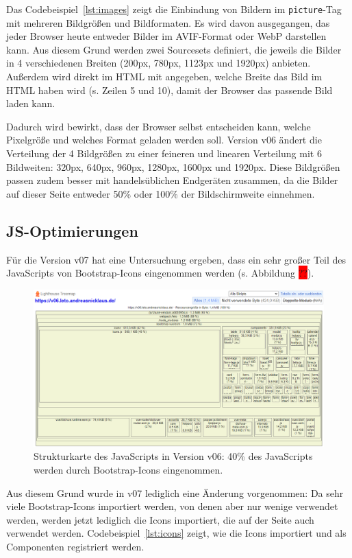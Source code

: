 \documentclass[11pt,a4paper]{article}
\begin{document}
Das Codebeispiel~\ref{lst:images} zeigt die Einbindung von Bildern im \verb|picture|-Tag mit mehreren Bildgrößen und Bildformaten.
Es wird davon ausgegangen, das jeder Browser heute entweder Bilder im AVIF-Format oder WebP darstellen kann.
Aus diesem Grund werden zwei Sourcesets definiert, die jeweils die Bilder in 4 verschiedenen Breiten (200px, 780px, 1123px und 1920px) anbieten.
Außerdem wird direkt im HTML mit angegeben, welche Breite das Bild im HTML haben wird (s. Zeilen 5 und 10), damit der Browser das passende Bild laden kann.

Dadurch wird bewirkt, dass der Browser selbst entscheiden kann, welche Pixelgröße und welches Format geladen werden soll.
Version v06 ändert die Verteilung der 4 Bildgrößen zu einer feineren und linearen Verteilung mit 6 Bildweiten: 320px, 640px, 960px, 1280px, 1600px und 1920px.
Diese Bildgrößen passen zudem besser mit handelsüblichen Endgeräten zusammen, da die Bilder auf dieser Seite entweder 50\% oder 100\% der Bildschirmweite einnehmen.   

\subsection{JS-Optimierungen}
Für die Version v07 hat eine Untersuchung ergeben, dass ein sehr großer Teil des JavaScripts von Bootstrap-Icons eingenommen werden (s. Abbildung \colorbox{red}{??}).

\begin{figure}[h]
  \centering
  \includegraphics[scale=.5]{images/v06_treemap.png}
  \caption{Strukturkarte des JavaScripts in Version v06: 40\% des JavaScripts werden durch Bootstrap-Icons eingenommen.}
  \label{fig:treemap}
\end{figure}

Aus diesem Grund wurde in v07 lediglich eine Änderung vorgenommen: Da sehr viele Bootstrap-Icons importiert werden, von denen aber nur wenige verwendet werden, werden jetzt lediglich die Icons importiert, die auf der Seite auch verwendet werden.
Codebeispiel~\ref{lst:icons} zeigt, wie die Icons importiert und als Componenten registriert werden.
\end{document}
